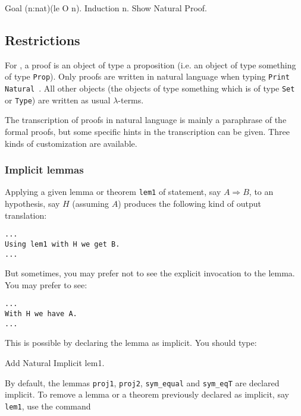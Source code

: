 \begin{coq_example}
Goal (n:nat)(le O n).
Induction n.
Show Natural Proof.
\end{coq_example}

\subsection*{Restrictions}

For \Natural, a proof is an object of type a proposition (i.e. an
object of type something of type {\tt Prop}). Only proofs are written
in natural language when typing {\tt Print Natural \ident}.  All other
objects (the objects of type something which is of type {\tt Set} or
{\tt Type}) are written as usual $\lambda$-terms.


The transcription of proofs in natural language is mainly a paraphrase of
the formal proofs, but some specific hints in the transcription
can be given.
Three kinds of customization are available.


\subsubsection*{Implicit lemmas}

Applying a given lemma or theorem \verb=lem1= of statement, say $A
\Rightarrow B$, to an hypothesis, say $H$ (assuming $A$) produces the
following kind of output translation:

\begin{verbatim}
...
Using lem1 with H we get B.
...
\end{verbatim}

But sometimes, you may prefer not to see the explicit invocation to
the lemma. You may prefer to see:

\begin{verbatim}
...
With H we have A.
...
\end{verbatim}

This is possible by declaring the lemma as implicit. You should type:

\begin{coq_example*}
Add Natural Implicit lem1.
\end{coq_example*}

By default, the lemmas \verb=proj1=, \verb=proj2=, \verb=sym_equal=
and \verb=sym_eqT= are declared implicit. To remove a lemma or a theorem
previously declared as implicit, say \verb=lem1=, use the command


